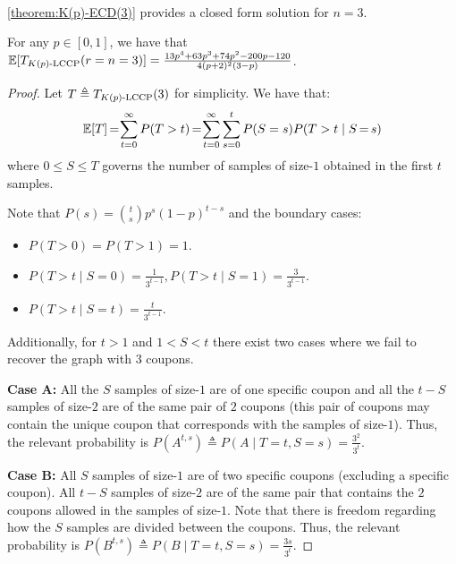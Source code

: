 \\
\autoref{theorem:K(p)-ECD(3)} provides a closed form solution for $n=3$.
\begin{theorem}
    \label{theorem:K(p)-ECD(3)}
    For any $p\in[0,1]$,
    we have that
    $\E[\T{\fmecd{K(p)}{}{3}}{r=n=3}] =
    \frac{13p^4+63p^3+74p^2-200p-120}{4(p+2)^2(3-p)}$.
\end{theorem}
\begin{proof}
Let $T \triangleq \T{\fmecd{K(p)}{}{3}}{3}$ for simplicity. 
We have that:
\[
\E[T] \hspace{-0.04cm}= \hspace{-0.08cm}\sum_{t=0}^\infty P(T > t) \hspace{-0.04cm}= \hspace{-0.08cm}\sum_{t=0}^\infty \sum_{s = 0}^t P(S=s) P(T > t \mid S\hspace{-0.04cm}=\hspace{-0.04cm}s)
\]
where $0 \leq S \leq T$ governs the number of samples of size-$1$ obtained in the first $t$ samples.

Note that $P(s) = \binom{t}{s} p^s (1-p)^{t-s}$ 
and the boundary cases:
\begin{itemize}
    \item $P(T > 0) = P(T > 1) = 1$.
    \item $P(T > t \mid S = 0) = \frac{1}{3^{t-1}}, P(T > t \mid S = 1) = \frac{3}{3^{t-1}}.$
    \item $P(T > t \mid S = t) = \frac{t}{3^{t-1}}.$
\end{itemize}

Additionally, for $t > 1$ and $1 < S < t$ there exist two cases where we fail to recover the graph with $3$ coupons.

\textbf{Case A:} All the $S$ samples of size-$1$ are of one specific coupon 
and all the $t-S$ samples of size-$2$ are of the same pair of $2$ coupons 
(this pair of coupons may contain the unique coupon that corresponds with the samples of size-$1$).
Thus, the relevant probability is $P(A^{t,s}) 
\triangleq
P(A \mid T=t, S=s)
= 
\frac{3^2}{3^t}.$

\textbf{Case B:} All $S$ samples of size-$1$ are of two specific coupons (excluding a specific coupon).
All $t-S$ samples of size-$2$
are of the same pair that contains the $2$ coupons allowed in the samples of size-$1$.
Note that there is freedom regarding how the $S$ samples are divided between the coupons. 
Thus, the relevant probability is
$
P(B^{t,s}) 
\triangleq 
P(B \mid T=t, S=s) 
=
\frac{3s}{3^t}.
$


\end{proof}
